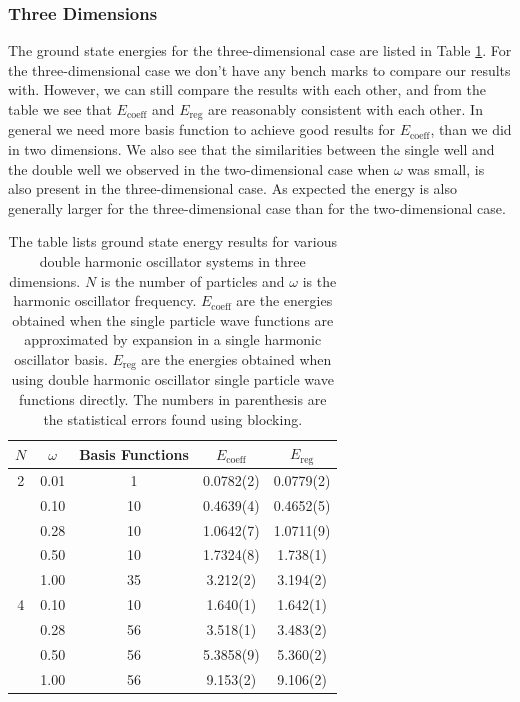 \documentclass[../main.tex]{subfiles}
\begin{document}
\subsubsection{Three Dimensions}

The ground state energies for the three-dimensional case are listed in Table \ref{tab: EnergiesDHO3D}. For the three-dimensional case we don't have any bench marks to compare our results with. However, we can still compare the results with each other, and from the table we see that $E_\textrm{coeff}$ and $E_\textrm{reg}$ are reasonably consistent with each other. In general we need more basis function to achieve good results for $E_\textrm{coeff}$, than we did in two dimensions. We also see that the similarities between the single well and the double well we observed in the two-dimensional case when $\omega$ was small, is also present in the three-dimensional case. As expected the energy is also generally larger for the three-dimensional case than for the two-dimensional case.

\begin{table}[!ht]
  \centering
  \begin{tabular}{c c c c c}
    \hline
    \hline
    $N$ & $\omega$ & Basis Functions & $E_\textrm{coeff}$ & $E_\textrm{reg}$ \\*
    \hline
    2 & 0.01 & 1 & 0.0782(2) & 0.0779(2) \\*
      & 0.10 & 10 & 0.4639(4) & 0.4652(5) \\*
      & 0.28 & 10 & 1.0642(7) & 1.0711(9) \\*
      & 0.50 & 10 & 1.7324(8) & 1.738(1) \\*
      & 1.00 & 35 & 3.212(2) & 3.194(2) \vspace{2 mm}\\*
      
    4 & 0.10 & 10 & 1.640(1) & 1.642(1) \\*
      & 0.28 & 56 & 3.518(1) & 3.483(2) \\*
      & 0.50 & 56 & 5.3858(9) & 5.360(2) \\*
      & 1.00 & 56 & 9.153(2) & 9.106(2) \\*
    \hline
    \hline
  \end{tabular}
  \caption{The table lists ground state energy results for various double harmonic oscillator systems in three dimensions. $N$ is the number of particles and $\omega$ is the harmonic oscillator frequency. $E_\textrm{coeff}$ are the energies obtained when the single particle wave functions are approximated by expansion in a single harmonic oscillator basis. $E_\textrm{reg}$ are the energies obtained when using double harmonic oscillator single particle wave functions directly. The numbers in parenthesis are the statistical errors found using blocking.}
  \label{tab: EnergiesDHO3D}
\end{table}
\end{document}
